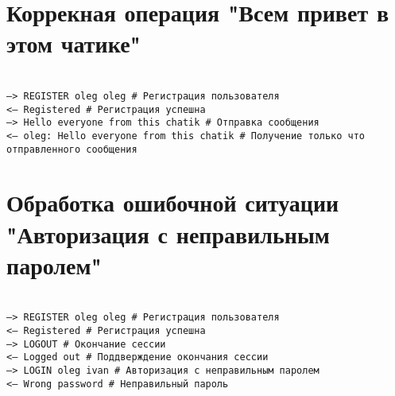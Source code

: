 \documentclass[a4paper, 10pt]{article}
\begin{document}
\section{Коррекная операция "Всем привет в этом чатике"}
\texttt{ 
    \\
    --> REGISTER oleg oleg \# Регистрация пользователя\\
    <-- Registered \# Регистрация успешна \\
    --> Hello everyone from this chatik \# Отправка сообщения \\
    <-- oleg: Hello everyone from this chatik \# Получение только что отправленного сообщения\\
}
\newpage
\section{Обработка ошибочной ситуации "Авторизация с неправильным паролем"}
\texttt{ \\
    --> REGISTER oleg oleg \# Регистрация пользователя\\
    <-- Registered \# Регистрация успешна \\
    --> LOGOUT \# Окончание сессии \\
    <-- Logged out \# Поддверждение окончания сессии \\
    --> LOGIN oleg ivan \# Авторизация с неправильным паролем \\
    <-- Wrong password \# Неправильный пароль
}
\end{document}
